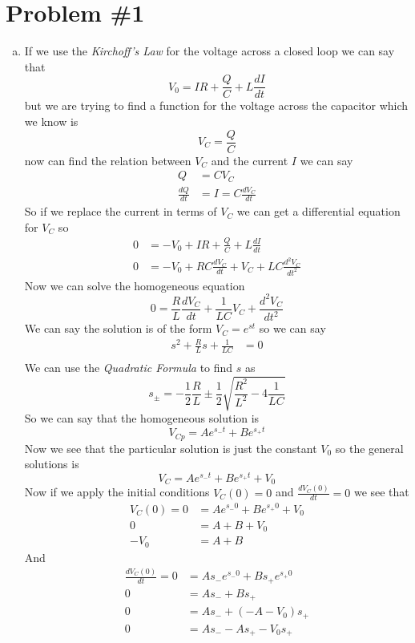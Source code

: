\documentclass[11pt]{article}
\numberwithin{equation}{section}
\begin{document}


\section{Problem \#1}
\begin{enumerate}[(a)]
\item
If we use the \emph{Kirchoff's Law} for the voltage across a closed loop we can say that
$$V_0 = IR+\frac{Q}{C}+L\frac{dI}{dt}$$
but we are trying to find a function for the voltage across the capacitor which we know is 
$$V_C = \frac{Q}{C}$$
now can find the relation between $V_C$ and the current $I$ we can say
\begin{align*}
Q &= CV_C\\
\frac{dQ}{dt} &= I = C\frac{dV_C}{dt}
\end{align*}
So if we replace the current in terms of $V_C$ we can get a differential equation for $V_C$ so
\begin{align*}
0 &= -V_0 + IR + \frac{Q}{C} + L\frac{dI}{dt}\\
0 &= -V_0 + RC\frac{dV_C}{dt} + V_C+LC\frac{d^2V_C}{dt^2}
\end{align*}
Now we can solve the homogeneous equation 
$$0 =  \frac{R}{L}\frac{dV_C}{dt} + \frac{1}{LC}V_C+\frac{d^2V_C}{dt^2}$$
We can say the solution is of the form $V_C = e^{st}$ so we can say 
\begin{align*}
s^2 + \frac{R}{L}s+\frac{1}{LC} &= 0\\
\end{align*}
We can use the \emph{Quadratic Formula} to find $s$ as
$$s_{\pm} = -\frac{1}{2}\frac{R}{L}\pm\frac{1}{2}\sqrt{\frac{R^2}{L^2}-4\frac{1}{LC}}$$
So we can say that the homogeneous solution is
$$V_{Cp} = Ae^{s_-t}+Be^{s_+t}$$
Now we see that the particular solution is just the constant $V_0$ so the general solutions is 
$$V_{C} = Ae^{s_-t}+Be^{s_+t} + V_0$$
Now if we apply the initial conditions $V_C(0) = 0$ and $\frac{dV_C(0)}{dt}=0$ we see that
\begin{align*}
V_{C}(0) = 0 &= Ae^{s_-0}+Be^{s_+0} + V_0\\
0 &= A+B + V_0\\
-V_0 &= A+B 
\end{align*}
And
\begin{align*}
\frac{dV_{C}(0)}{dt} = 0 &= As_-e^{s_-0}+Bs_+e^{s_+0}\\
0 &= As_-+Bs_+\\
0 &= As_-+(-A-V_0)s_+\\
0 &= As_- - As_+ - V_0s_+\\

\end{align*}
\end{enumerate}
\end{document}

